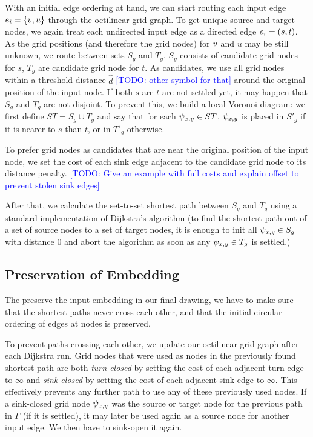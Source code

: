 \documentclass{sig-alternate-sigmod09}
\newcommand\TODO[1]{\textcolor{blue}{\small [TODO: #1]}}
\begin{document}
With an initial edge ordering at hand, we can start routing each input edge $e_i = \{v, u\}$ through the octilinear grid graph.
To get unique source and target nodes, we again treat each undirected input edge as a directed edge $e_i = (s, t)$.
As the grid positions (and therefore the grid nodes) for $v$ and $u$ may be still unknown, we route between sets $S_g$ and $T_g$.
$S_g$ consists of candidate grid nodes for $s$, $T_g$ are candidate grid node for $t$.
As candidates, we use all grid nodes within a threshold distance $\hat d$ \TODO{other symbol for that} around the original position of the input node.
If both $s$ are $t$ are not settled yet, it may happen that $S_g$ and $T_g$ are not disjoint.
To prevent this, we build a local Voronoi diagram: we first define $ST = S_g \cup T_g$ and say that for each $\psi_{x, y} \in ST$, $\psi_{x, y}$ is placed in $S'_g$ if it is nearer to $s$ than $t$, or in $T'_g$ otherwise.

To prefer grid nodes as candidates that are near the original position of the input node, we set the cost of each sink edge adjacent to the candidate grid node to its distance penalty. \TODO{Give an example with full costs and explain offset to prevent stolen sink edges} 

After that, we calculate the set-to-set shortest path between $S_g$ and $T_g$ using a standard implementation of Dijkstra's algorithm (to find the shortest path out of a set of source nodes to a set of target nodes, it is enough to init all $\psi_{x, y} \in S_g$ with distance 0 and abort the algorithm as soon as any $\psi_{x, y} \in T_g$ is settled.)

\subsection{Preservation of Embedding}

The preserve the input embedding in our final drawing, we have to make sure that the shortest paths never cross each other, and that the initial circular ordering of edges at nodes is preserved.

To prevent paths crossing each other, we update our octilinear grid graph after each Dijkstra run.
Grid nodes that were used as nodes in the previously found shortest path are both \emph{turn-closed} by setting the cost of each adjacent turn edge to $\infty$ and \emph{sink-closed} by setting the cost of each adjacent sink edge to $\infty$.
This effectively prevents any further path to use any of these previously used nodes.
If a sink-closed grid node $\psi_{x, y}$ was the source or target node for the previous path in $\Gamma$ (if it is settled), it may later be used again as a source node for another input edge.
We then have to sink-open it again.
\end{document}
